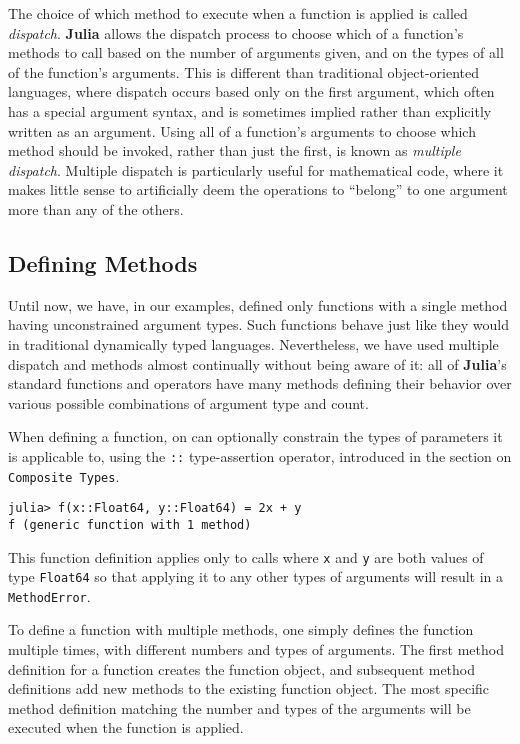 \documentclass[
]{article}
\begin{document}
The choice of which method to execute when a function is applied is
called \emph{dispatch}. \textbf{Julia} allows the dispatch process to
choose which of a function's methods to call based on the number of
arguments given, and on the types of all of the function's arguments.
This is different than traditional object-oriented languages, where
dispatch occurs based only on the first argument, which often has a
special argument syntax, and is sometimes implied rather than explicitly
written as an argument. Using all of a function's arguments to choose
which method should be invoked, rather than just the first, is known as
\emph{multiple dispatch}. Multiple dispatch is particularly useful for
mathematical code, where it makes little sense to artificially deem the
operations to ``belong'' to one argument more than any of the others.

\hypertarget{defining-methods}{%
\subsection{Defining Methods}\label{defining-methods}}

Until now, we have, in our examples, defined only functions with a
single method having unconstrained argument types. Such functions behave
just like they would in traditional dynamically typed languages.
Nevertheless, we have used multiple dispatch and methods almost
continually without being aware of it: all of \textbf{Julia}'s standard
functions and operators have many methods defining their behavior over
various possible combinations of argument type and count.

When defining a function, on can optionally constrain the types of
parameters it is applicable to, using the \texttt{::} type-assertion
operator, introduced in the section on \texttt{Composite\ Types}.

\begin{verbatim}
julia> f(x::Float64, y::Float64) = 2x + y
f (generic function with 1 method)
\end{verbatim}

This function definition applies only to calls where \texttt{x} and
\texttt{y} are both values of type \texttt{Float64} so that applying it
to any other types of arguments will result in a \texttt{MethodError}.

To define a function with multiple methods, one simply defines the
function multiple times, with different numbers and types of arguments.
The first method definition for a function creates the function object,
and subsequent method definitions add new methods to the existing
function object. The most specific method definition matching the number
and types of the arguments will be executed when the function is
applied.
\end{document}
